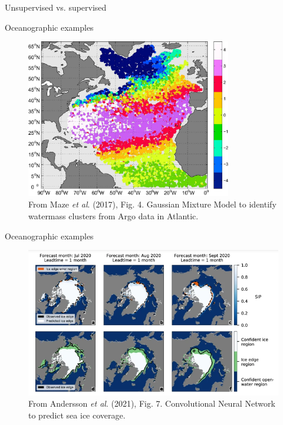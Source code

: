 \documentclass[xcolor=x11names,compress]{beamer}
\renewcommand{\(}{\begin{columns}}
\renewcommand{\)}{\end{columns}}
\newcommand{\<}[1]{\begin{column}{#1}}
\renewcommand{\>}{\end{column}}
\begin{document}
\begin{frame}{Unsupervised vs. supervised}
\end{frame}


\begin{frame}{Oceanographic examples}

\begin{figure}
  \includegraphics[width=0.8\textwidth]{Maze_et_al_2017_fig4}
  \caption{From Maze \emph{et al}. (2017), Fig. 4. Gaussian Mixture Model to
  identify watermass clusters from Argo data in Atlantic.}
\end{figure}

\end{frame}


\begin{frame}{Oceanographic examples}

\begin{figure}
  \includegraphics[width=\textwidth]{Andersson_et_al_2021_fig7}
  \caption{From Andersson \emph{et al}. (2021), Fig. 7. Convolutional Neural
  Network to predict sea ice coverage.}
\end{figure}

\end{frame}
\end{document}
